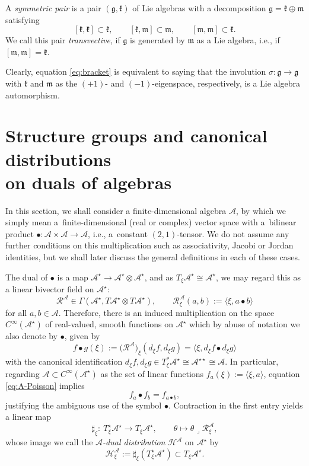 \documentclass[pdftex]{sigma}
\numberwithin{equation}{section}
\newcommand{\be}{\begin{equation}}
\newcommand{\ee}{\end{equation}}
\newcommand{\lra}{\longrightarrow}
\newcommand{\hh}{\mathcal{H}}
\newcommand{\m}{\mathfrak{m}}
\newcommand{\g}{{\mathfrak{g}}}
\renewcommand{\k}{{\mathfrak k}}
\renewcommand{\m}{{\mathfrak m}}
\newcommand{\cR}{\mathcal{R}}
\newcommand{\cA}{\mathcal{A}}
\begin{document}
\begin{Definition} \label{df:symm}
A {\em symmetric pair} is a pair $(\g, \k)$ of Lie algebras with a decomposition $\g = \k \oplus \m$ satisfying \be \label{eq:bracket}
{}[\k, \k] \subset \k, \qquad [\k, \m] \subset \m, \qquad [\m, \m] \subset \k.
\ee
We call this pair {\em transvective}, if $\g$ is generated by $\m$ as a Lie algebra, i.e., if $[\m, \m] = \k$.
\end{Definition}

Clearly, equation \eqref{eq:bracket} is equivalent to saying that the involution $\sigma\colon \g \to \g$ with $\k$ and $\m$ as the $(+1)$- and $(-1)$-eigenspace, respectively, is a Lie algebra automorphism.

\section[Structure groups and canonical distributions on duals of algebras]{Structure groups and canonical distributions\\ on duals of algebras}\label{sec:structure-general}

In this section, we shall consider a finite-dimensional algebra $\cA$, by which we simply mean a~finite-dimensional (real or complex) vector space with a~bilinear product $\bullet\colon \cA \times \cA \to \cA$, i.e., a~constant $(2,1)$-tensor.
We do not assume any further conditions on this multiplication such as associativity, Jacobi or Jordan identities, but we shall later discuss the general definitions in each of these cases.

The dual of $\bullet$ is a map $\cA^\star \to \cA^\star \otimes \cA^\star$, and as $T_\xi \cA^\star \cong \cA^\star$, we may regard this as a linear bivector field on $\cA^\star$:
\be \label{eq:R-bivectorfield}
\cR^\cA \in \Gamma(\cA^\star, T\cA^\star \otimes T\cA^\star), \qquad \cR^\cA_\xi (a, b) := \langle \xi, a \bullet b\rangle
\ee
for all $a,b \in \cA$.
Therefore, there is an induced multiplication on the space $C^\infty(\cA^\star)$ of real-valued, smooth functions on $\cA^{\star}$ which by abuse of notation we also denote by $\bullet$, given by
\be \label{eq:A-Poisson}
f \bullet g(\xi) := \big(\cR^\cA\big)_\xi (d_\xi f, d_\xi g) = \langle \xi, d_\xi f \bullet d_\xi g \rangle
\ee
with the canonical identification $d_\xi f, d_\xi g \in T^\ast_\xi \cA^\star \cong \cA^{\star\star} \cong \cA$. In particular, regarding $ \cA \subset C^\infty(\cA^\star) $ as the set of linear functions $f_a(\xi) := \langle \xi, a\rangle$, equation \eqref{eq:A-Poisson} implies
\[ %
f_a \bullet f_b = f_{a \bullet b},
\]
justifying the ambiguous use of the symbol $\bullet$. %
Contraction in the first entry yields a linear map
\be \label{eq:sharp-xi}
\sharp_\xi\colon\ T^\star_\xi \cA^\star \lra T_\xi \cA^\star, \qquad \theta \longmapsto \theta \lrcorner \cR^\cA_\xi,
\ee
whose image we call the {\em $\cA$-dual distribution} $\hh^\cA$ on $\cA^\star$ by
\be \label{eq:grad-dist}
\hh^\cA_\xi := \sharp_\xi(T_\xi^\star \cA^\star) \subset T_\xi \cA^\star.
\ee
\end{document}
